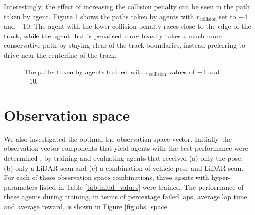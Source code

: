

Interestingly, the effect of increasing the collision penalty can be seen in the path taken by agent.
Figure \ref{fig:path_reward_collision} shows the paths taken by agents with $r_{\text{collision}}$ set to $-4$ and $-10$.
The agent with the lower collision penalty races close to the edge of the track, while the agent that is penalised more heavily takes a much more conservative path by staying clear of the track boundaries, instead preferring to drive near the centerline of the track.

\begin{figure}[htb!]
    \centering
    
    \caption[Paths taken by agents trained with different collision penalties]{The paths taken by agents trained with $r_{\text{collision}}$ values of $-4$ and $-10$.}
    \label{fig:path_reward_collision}
\end{figure}











\section{Observation space}\label{sec:obs_space}

We also investigated the optimal the observation space vector.
Initially, the observation vector components that yield agents with the best performance were determined
, by training and evaluating agents that received (a) only the pose, (b) only a LiDAR scan and (c) a combination of vehicle pose and LiDAR scan.
For each of these observation space combinations, three agents with hyper-parameters listed in Table \ref{tab:inital_values} were trained.
The performance of these agents during training, in terms of percentage failed laps, average lap time and average reward, is shown in Figure \ref{fig:obs_space}.

